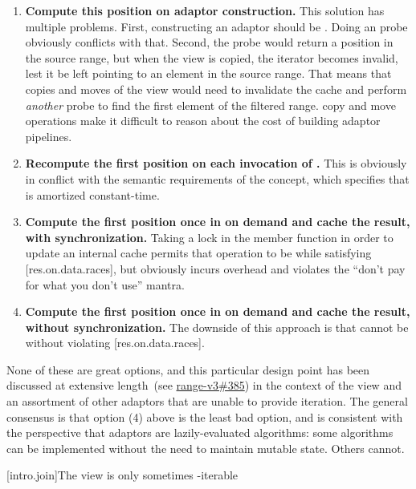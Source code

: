 \begin{enumerate}
\item \textbf{Compute this position on adaptor construction.} This solution has
multiple problems. First, constructing an adaptor should be . Doing an
 probe obviously conflicts with that. Second, the probe would return a
position in the source range, but when the  view is copied, the
iterator becomes invalid, lest it be left pointing to an element in the source
range. That means that copies and moves of the  view would need to
invalidate the cache and perform \textit{another}  probe to find the first
element of the filtered range.  copy and move operations make it difficult
to reason about the cost of building adaptor pipelines.
\item \textbf{Recompute the first position on each invocation of .} This is
obviously in conflict with the semantic requirements of the  concept,
which specifies that  is amortized constant-time.
\item \textbf{Compute the first position once in  on demand and cache
the result, with synchronization.} Taking a lock in the  member
function in order to update an internal cache permits that operation to be
 while satisfying [res.on.data.races], but obviously incurs overhead
and violates the ``don't pay for what you don't use'' mantra.
\item \textbf{Compute the first position once in  on demand and cache
the result, without synchronization.} The downside of this approach is that
 cannot be  without violating [res.on.data.races].
\end{enumerate}

\pnum
None of these are great options, and this particular design point has been
discussed at extensive length~(see
\href{https://github.com/ericniebler/range-v3/issues/385}{range-v3\#385})
in the context of the  view and an assortment of other adaptors
that are unable to provide  iteration. The general consensus is
that option (4) above is the least bad option, and is consistent with the
perspective that adaptors are lazily-evaluated algorithms: some algorithms can
be implemented without the need to maintain mutable state. Others cannot.

[intro.join]{The  view is only sometimes -iterable}

